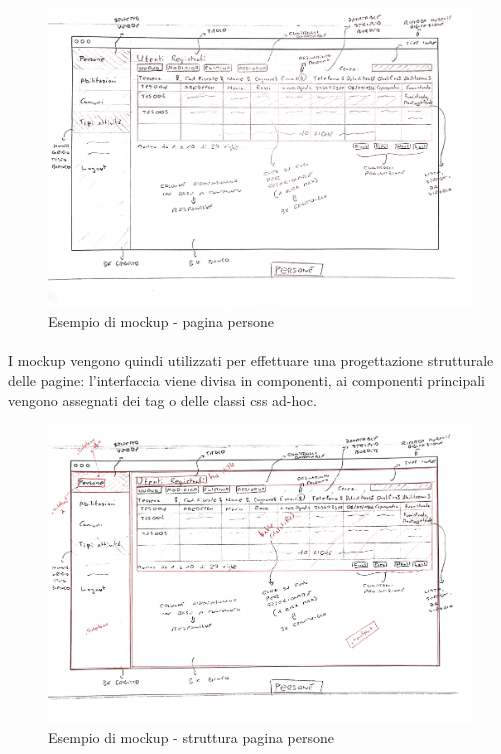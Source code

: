 \documentclass[11pt,a4paper,english]{article}
\begin{document}
\begin{figure}[H]
    \centering
    \includegraphics[width=1\textwidth]{img/mockup_web_persone.pdf}
    \caption{Esempio di mockup - pagina persone}
\end{figure}

\paragraph{} I mockup vengono quindi utilizzati per effettuare una progettazione strutturale delle pagine: l'interfaccia viene divisa in componenti, ai componenti principali vengono assegnati dei tag o delle classi css ad-hoc.

\begin{figure}[H]
    \centering
    \includegraphics[width=1\textwidth]{img/mockup_web_persone_2.pdf}
    \caption{Esempio di mockup - struttura pagina persone}
\end{figure}
\end{document}
